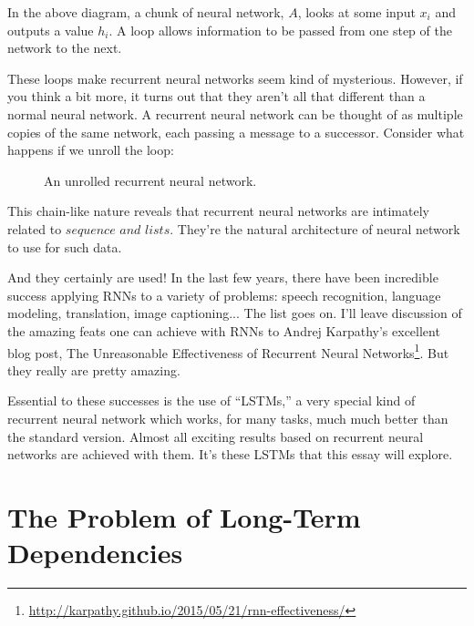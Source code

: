 \documentclass[12pt]{article} %
\begin{document}
In the above diagram, a chunk of neural network, $A$, looks at some input $x_{i}$ and outputs a value $h_{i}$. A loop allows information to be passed from one step of the network to the next.

These loops make recurrent neural networks seem kind of mysterious. However, if you think a bit more, it turns out that they aren't all that different than a normal neural network. A recurrent neural network can be thought of as multiple copies of the same network, each passing a message to a successor. Consider what happens if we unroll the loop: %
\begin{figure}[H] %
\caption{An unrolled recurrent neural network.}
\label{fig:rnnunrolled}
\end{figure}

This chain-like nature reveals that recurrent neural networks are intimately related to $\textit{sequence and lists}$. They're the natural architecture of neural network to use for such data.

And they certainly are used! In the last few years, there have been incredible success applying RNNs to a variety of problems: speech recognition, language modeling, translation, image captioning... The list goes on. I'll leave discussion of the amazing feats one can achieve with RNNs to Andrej Karpathy's excellent blog post, The Unreasonable Effectiveness of Recurrent Neural Networks\footnote{\url{http://karpathy.github.io/2015/05/21/rnn-effectiveness/}}. But they really are pretty amazing.

Essential to these successes is the use of ``LSTMs,'' a very special kind of recurrent neural network which works, for many tasks, much much better than the standard version. Almost all exciting results based on recurrent neural networks are achieved with them. It's these LSTMs that this essay will explore.

\section{The Problem of Long-Term Dependencies}
\end{document}
